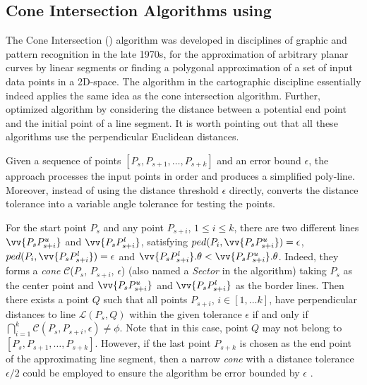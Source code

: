 \subsection{Cone Intersection Algorithms using \ped}


The Cone Intersection (\cia) algorithm \cite{Williams:Longest, Sklansky:Cone} was developed in disciplines of graphic and pattern recognition in the late 1970s, for the approximation of arbitrary planar curves by linear segments or finding a polygonal approximation of a set of input data points in a 2D-space. The \sleeve algorithm \cite{Zhao:Sleeve} in the cartographic discipline essentially indeed applies the same idea as the cone intersection algorithm.
Further, \cite{Dunham:Cone}  optimized algorithm \cia by considering the distance between a potential end point and the initial point of a line segment. It is worth pointing out that all these algorithms use the perpendicular Euclidean distances.


Given a sequence of points $[P_{s}, P_{s+1}, \ldots, P_{s+k}]$ and an error bound $\epsilon$, the \cia approach processes the input points in order and produces a simplified poly-line.  Moreover, instead of using the distance threshold $\epsilon$ directly, \cia converts the distance tolerance into a variable angle tolerance for testing the points.

For the start point $P_s$ and any point $P_{s+i}$, $1\le i\le k$, there are two different lines $\vv{P_sP^u_{s+i}}$ and $\vv{P_sP^l_{s+i}}$, satisfying $ped(P_i, \vv{P_sP^u_{s+i}}) = \epsilon$, $ped(P_i, \vv{P_sP^l_{s+i}}) = \epsilon$ and $\vv{P_sP^l_{s+i}}.\theta < \vv{P_sP^u_{s+i}}.\theta$. Indeed, they forms a \emph{cone} $\mathcal{C}$($P_s$, $P_{s+i}$, $\epsilon$) (also named a \emph{Sector} in the \sleeve algorithm) taking $P_s$ as the center point and $\vv{P_sP^u_{s+i}}$ and $\vv{P_sP^l_{s+i}}$ as the border lines.
Then there exists a point $Q$ such that all points $P_{s+i}$, $i \in [1, ... k]$, have perpendicular distances to
line $\mathcal{L}(P_s,Q)$ within the given \ped tolerance $\epsilon$ if and only if $\bigcap_{i=1}^{k}\mathcal{C}(P_s, P_{s+i}, \epsilon) \ne \phi$.
Note that in this case, point $Q$ may not belong to $[P_{s}, P_{s+1}, \ldots, P_{s+k}]$.
However, if the last point $P_{s+k}$ is chosen as the end point of the approximating line segment, then a narrow \emph{cone} with a distance tolerance $\epsilon/2$ could be employed to ensure the algorithm be \ped error bounded by $\epsilon$ \cite{Zhao:Sleeve}.


